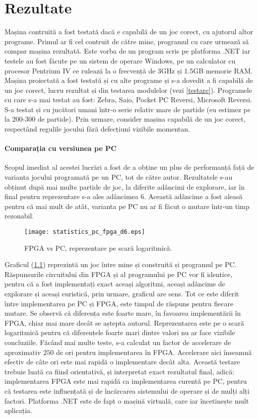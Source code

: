 \documentclass[12pt,twoside,a4paper,fleqn]{book}
\theoremstyle{definition}
\begin{document}
\chapter{Rezultate}
Mașina contruită a fost testată dacă e capabilă de un joc corect, cu ajutorul altor programe. Primul ar fi cel contruit de către mine, programul cu care urmează să compar mașina rezultată. Este vorba de un program scris pe platforma .NET iar testele au fost făcute pe un sistem de operare Windows, pe un calculator cu procesor Pentrium IV ce rulează la o frecvență de 3GHz și 1.5GB memorie RAM. Mașina proiectată a fost testată și cu alte programe și s-a dovedit a fi capabilă de un joc corect, lucru rezultat și din testarea modulelor (vezi \ref{testare}). Programele cu care s-a mai testat au fost: Zebra, Saio, Pocket PC Reversi, Microsoft Reversi. S-a testat și cu jucători umani într-o serie relativ mare de partide (eu estimez pe la 200-300 de partide). Prin urmare, consider mașina capabilă de un joc corect, respectând regulile jocului fără defecțiuni vizibile momentan.\\
\subsubsection{Comparația cu versiunea pe PC}
Scopul imediat al acestei lucrări a fost de a obține un plus de performanță față de varianta jocului programată pe un PC, tot de către autor. Rezultatele s-au obținut după mai multe partide de joc, la diferite adâncimi de explorare, iar în final pentru reprezentare s-a ales adâncimea $6$. Această adâncime a fost aleasă pentru că mai mult de atât, varianta pe PC nu ar fi făcut o mutare într-un timp rezonabil.
\begin{figure}[h]
\begin{center}
\texttt{[image: statistics\_pc\_fpga\_d6.eps]}
\end{center}
\caption{\small{FPGA vs PC, reprezentare pe scară logaritmică.}}
\label{fig:statistics_00}
\end{figure}
Graficul (\ref{fig:statistics_00}) reprezintă un joc între mine și construită și programul pe PC. Răspunsurile circuitului din FPGA și al programului pe PC vor fi identice, pentru că a fost implementați exact aceași algoritmi, aceași adâncime de explorare și aceași euristică, prin urmare, graficul are sens. Tot ce este diferit între implementarea pe PC și FPGA, este timpul de răspuns pentru fiecare mutare. Se observă că diferența este foarte mare, în favoarea implementării în FPGA, chiar mai mare decât se aștepta autorul. Reprezentarea este pe o scară logaritmică pentru că diferențele foarte mari dintre valori nu ar face vizibile concluziile. Făcând mai multe teste, s-a calculat un factor de accelerare de aproximativ $250$ de ori pentru implementarea în FPGA. Accelerare aici înseamnă efectiv de câte ori este mai rapidă o implementare decât alta. Această testare trebuie luată ca fiind orientativă, și interpretat exact rezultatul final, adică: implementarea FPGA este mai rapidă ca implementarea curentă pe PC, pentru că testarea este influențată și de încărcarea sistemului de operare și de mulți alți factori. Platforma .NET este de fapt o mașină virtuală, care iar încetinește mult aplicația.\\
\end{document}
